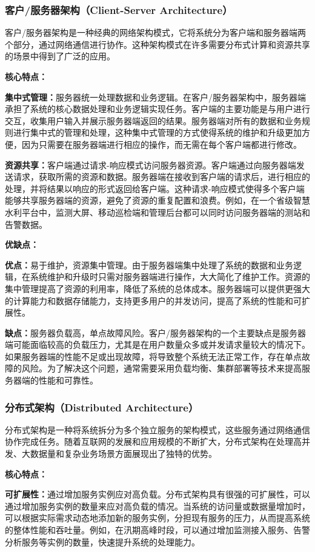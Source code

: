 \subsubsection{客户/服务器架构（Client-Server Architecture）}
客户/服务器架构是一种经典的网络架构模式，它将系统分为客户端和服务器端两个部分，通过网络通信进行协作。这种架构模式在许多需要分布式计算和资源共享的场景中得到了广泛的应用。

\textbf{核心特点：}

\textbf{集中式管理：}服务器统一处理数据和业务逻辑。在客户/服务器架构中，服务器端承担了系统的核心数据处理和业务逻辑实现任务。客户端的主要功能是与用户进行交互，收集用户输入并展示服务器端返回的结果。服务器端对所有的数据和业务规则进行集中式的管理和处理，这种集中式管理的方式使得系统的维护和升级更加方便，因为只需要在服务器端进行相应的操作，而无需在每个客户端都进行修改。

\textbf{资源共享：}客户端通过请求-响应模式访问服务器资源。客户端通过向服务器端发送请求，获取所需的资源和数据。服务器端在接收到客户端的请求后，进行相应的处理，并将结果以响应的形式返回给客户端。这种请求-响应模式使得多个客户端能够共享服务器端的资源，避免了资源的重复配置和浪费。例如，在一个省级智慧水利平台中，监测大屏、移动巡检端和管理后台都可以同时访问服务器端的测站和告警数据。

\textbf{优缺点：}

\textbf{优点：}易于维护，资源集中管理。由于服务器端集中处理了系统的数据和业务逻辑，在系统维护和升级时只需对服务器端进行操作，大大简化了维护工作。资源的集中管理提高了资源的利用率，降低了系统的总体成本。服务器端可以提供更强大的计算能力和数据存储能力，支持更多用户的并发访问，提高了系统的性能和可扩展性。

\textbf{缺点：}服务器负载高，单点故障风险。客户/服务器架构的一个主要缺点是服务器端可能面临较高的负载压力，尤其是在用户数量众多或并发请求量较大的情况下。如果服务器端的性能不足或出现故障，将导致整个系统无法正常工作，存在单点故障的风险。为了解决这个问题，通常需要采用负载均衡、集群部署等技术来提高服务器端的性能和可靠性。

\subsubsection{分布式架构（Distributed Architecture）}
分布式架构是一种将系统拆分为多个独立服务的架构模式，这些服务通过网络通信协作完成任务。随着互联网的发展和应用规模的不断扩大，分布式架构在处理高并发、大数据量和复杂业务场景方面展现出了独特的优势。

\textbf{核心特点：}

\textbf{可扩展性：}通过增加服务实例应对高负载。分布式架构具有很强的可扩展性，可以通过增加服务实例的数量来应对高负载的情况。当系统的访问量或数据量增加时，可以根据实际需求动态地添加新的服务实例，分担现有服务的压力，从而提高系统的整体性能和吞吐量。例如，在汛期高峰时段，可以通过增加监测接入服务、告警分析服务等实例的数量，快速提升系统的处理能力。

